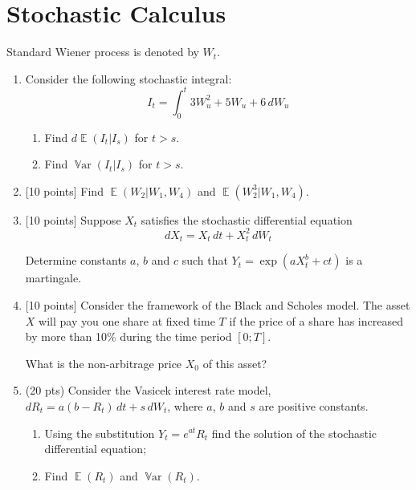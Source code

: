 \documentclass[12pt, a4paper]{article}
\DeclareMathOperator{\E}{\mathbb{E}}
\DeclareMathOperator{\Var}{\mathbb{V}ar}
\begin{document}
\section*{Stochastic Calculus}

Standard Wiener process is denoted by $W_t$.

\begin{enumerate}
  \item Consider the following stochastic integral:
\[
I_t = \int_0^t 3W_u^2+5W_u + 6 \, dW_u
\]

\begin{enumerate}
\item Find $d\E(I_t|I_s)$ for $t>s$.
\item Find $\Var(I_t|I_s)$ for $t>s$.
\end{enumerate}


\item {[10 points]} Find $\E(W_2 | W_1, W_4)$ and $\E(W_2^3 | W_1, W_4)$.


  \item {[10 points]} Suppose $X_t$ satisfies the stochastic differential equation
  \[
    dX_t = X_t \, dt + X_t^2 \, dW_t
  \]

  Determine constants $a$, $b$ and $c$ such that $Y_t = \exp(aX_t^b + ct)$ is a martingale.

  \item {[10 points]} Consider the framework of the Black and Scholes model.
The asset $X$ will pay you one share at fixed time $T$ if the price of a share
has increased by more than 10\% during the time period $[0;T]$.

What is the non-arbitrage price $X_0$ of this asset?
\item (20 pts) Consider the Vasicek interest rate model, $dR_t=a(b-R_t) \, dt+s \, dW_t$, where $a$, $b$ and $s$ are positive constants.
\begin{enumerate}
\item Using the substitution $Y_t=e^{at} R_t$ find the solution of the stochastic differential equation;
\item Find $\E(R_t)$ and $\Var(R_t)$.
\end{enumerate}

\end{enumerate}
\end{document}
